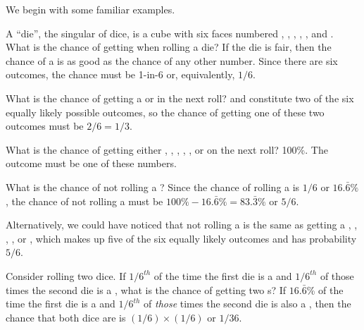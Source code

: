 We begin with some familiar examples.

\begin{example}\label{dieAllOutcomesex}{A ``die'', the singular of dice, is a cube with six faces numbered , , , , , and . What is the chance of getting  when rolling a die?}\label{probOf1}
If the die is fair, then the chance of a  is as good as the chance of any other number. Since there are six outcomes, the chance must be 1-in-6 or, equivalently, $1/6$.
\end{example}

\begin{example}{What is the chance of getting a  or  in the next roll?}\label{probOf1Or2}
 and  constitute two of the six equally likely possible outcomes, so the chance of getting one of these two outcomes must be $2/6 = 1/3$.
\end{example}

\begin{example}{What is the chance of getting either , , , , , or  on the next roll?}\label{probOf123456}
100\%. The outcome must be one of these numbers.
\end{example}

\begin{example}{What is the chance of not rolling a ?}\label{probNot2}
Since the chance of rolling a  is $1/6$ or $16.\bar{6}\%$, the chance of not rolling a  must be $100\% - 16.\bar{6}\%=83.\bar{3}\%$ or $5/6$.

Alternatively, we could have noticed that not rolling a  is the same as getting a , , , , or , which makes up five of the six equally likely outcomes and has probability $5/6$.
\end{example}

\begin{example}\label{dieProportionProbex} {Consider rolling two dice. If $1/6^{th}$ of the time the first die is a  and $1/6^{th}$ of those times the second die is a , what is the chance of getting two s?}\label{probOf2Ones}
If $16.\bar{6}$\% of the time the first die is a  and $1/6^{th}$ of \emph{those} times the second die is also a , then the chance that both dice are  is $(1/6)\times (1/6)$ or $1/36$.
\end{example}

